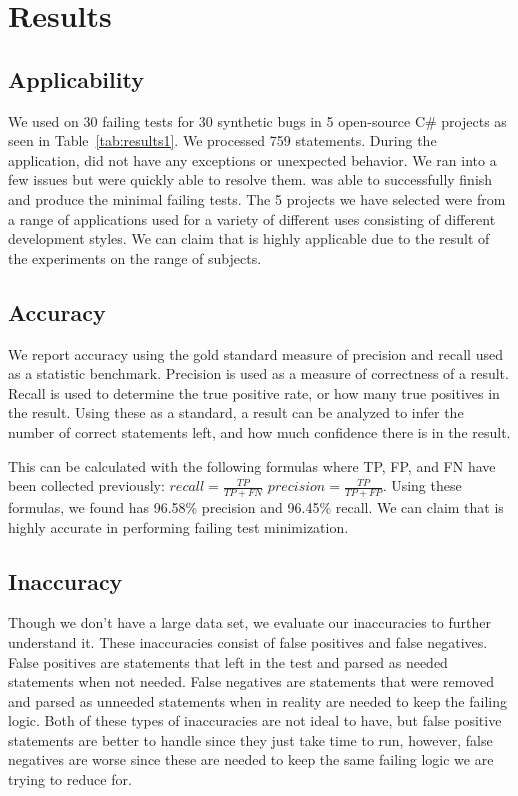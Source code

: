\clearpage %

\chapter{Results}\label{CH6_Results}

\section{Applicability}
We used \mytool on 30 failing tests for 30 synthetic bugs in 5 open-source C\# projects as seen in Table~\ref{tab:results1}. We processed 759 statements. During the application, \mytool did not have any exceptions or unexpected behavior. We ran into a few issues but were quickly able to resolve them. \mytool was able to successfully finish and produce the minimal failing tests. The 5 projects we have selected were from a range of applications used for a variety of different uses consisting of different development styles. We can claim that \mytool is highly applicable due to the result of the experiments on the range of subjects.

\section{Accuracy}
We report accuracy using the gold standard measure of precision and recall used as a statistic benchmark. Precision is used as a measure of correctness of a result. Recall is used to determine the true positive rate, or how many true positives in the result. Using these as a standard, a result can be analyzed to infer the number of correct statements left, and how much confidence there is in the result. 

This can be calculated with the following formulas where TP, FP, and FN have been collected previously: $recall = \frac{TP}{TP + FN}$ $precision = \frac{TP}{TP+FP}$. Using these formulas, we found \mytool has 96.58\% precision and 96.45\% recall. We can claim that \mytool is highly accurate in performing failing test minimization. 

\section{Inaccuracy}
Though we don't have a large data set, we evaluate our inaccuracies to further understand it. These inaccuracies consist of false positives and false negatives. False positives are statements that \mytool left in the test and parsed as needed statements when not needed. False negatives are statements that were removed and parsed as unneeded statements when in reality are needed to keep the failing logic. Both of these types of inaccuracies are not ideal to have, but false positive statements are better to handle since they just take time to run, however, false negatives are worse since these are needed to keep the same failing logic we are trying to reduce for.

